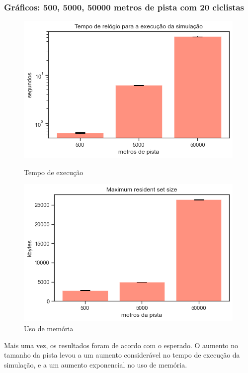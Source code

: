 \documentclass{beamer}
\begin{document}
\begin{frame}
\frametitle{Gráficos: 500, 5000, 50000 metros de pista com 20 ciclistas}


\begin{figure}[!htb]
  \includegraphics[width=\linewidth]{imgs/pistas_tempo}
  \caption{Tempo de execução}\label{fig:awesome_image1}
\endminipage\hfill
{}
  \includegraphics[width=\linewidth]{imgs/pistas_memoria}
  \caption{Uso de memória}\label{fig:awesome_image2}
  \endminipage\hfill

\end{figure}

Mais uma vez, os resultados foram de acordo com o esperado. O aumento no tamanho da pista levou a um aumento considerável no tempo de execução da simulação, e a um aumento exponencial no uso de memória.

\end{frame}
\end{document}
